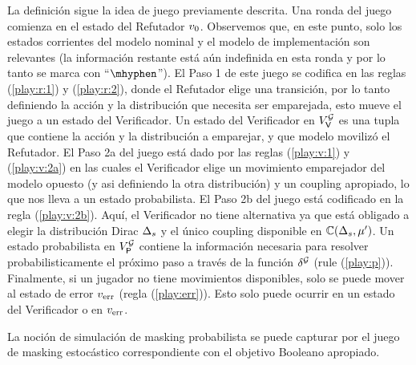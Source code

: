 La definición sigue la idea de juego previamente descrita. Una ronda del juego comienza en el estado del Refutador $v_0$.  Observemos que, en este punto, solo los estados corrientes del modelo nominal y el modelo de implementación son relevantes (la información restante está aún indefinida en esta ronda y por lo tanto se marca con ``$\mhyphen$'').  El Paso 1 de este juego se codifica en las reglas
(\ref{play:r:1}) y (\ref{play:r:2}), donde el Refutador elige una transición, por lo tanto definiendo la acción y la distribución que necesita ser emparejada,  esto mueve el juego a un estado del Verificador. Un estado del Verificador en $V^{\mathcal{G}}_{\mathsf{V}}$ es una tupla que contiene la acción y la distribución a emparejar, y que modelo movilizó el Refutador. El Paso 2a del juego está dado por las reglas (\ref{play:v:1}) y
(\ref{play:v:2a}) en las cuales el Verificador elige un movimiento emparejador del modelo opuesto (y asi definiendo la otra distribución) y un coupling apropiado, lo que nos lleva a un estado probabilista.  El Paso 2b
del juego está codificado en la regla (\ref{play:v:2b}).  Aquí, el Verificador no tiene alternativa ya que está obligado a elegir la distribución Dirac
$\Delta_s$ y el único coupling disponible en
$\mathbb{C}(\Delta_s,\mu')$.  Un estado probabilista en
$V^{\mathcal{G}}_{\mathsf{P}}$ contiene la información necesaria para resolver probabilisticamente el próximo paso a través de la función $\delta^{\mathcal{G}}$ (rule
(\ref{play:p})).
Finalmente, si un jugador no tiene movimientos disponibles, solo se puede mover al estado de error $v_{\text{err}}$ (regla (\ref{play:err})). Esto solo puede ocurrir en un estado del Verificador o en
$v_{\text{err}}$.


La noción de simulación de masking probabilista se puede capturar por el juego de masking estocástico correspondiente con el objetivo Booleano apropiado.

